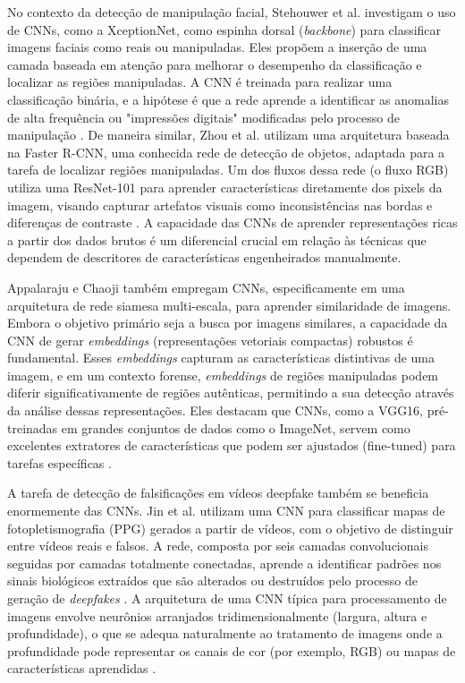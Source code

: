 No contexto da detecção de manipulação facial, Stehouwer et al. \cite{stehouwer2019detection} investigam o uso de CNNs, como a XceptionNet, como espinha dorsal (\textit{backbone}) para classificar imagens faciais como reais ou manipuladas. Eles propõem a inserção de uma camada baseada em atenção para melhorar o desempenho da classificação e localizar as regiões manipuladas. A CNN é treinada para realizar uma classificação binária, e a hipótese é que a rede aprende a identificar as anomalias de alta frequência ou "impressões digitais" modificadas pelo processo de manipulação \cite{stehouwer2019detection}. De maneira similar, Zhou et al. \cite{zhou2018manipulation} utilizam uma arquitetura baseada na Faster R-CNN, uma conhecida rede de detecção de objetos, adaptada para a tarefa de localizar regiões manipuladas. Um dos fluxos dessa rede (o fluxo RGB) utiliza uma ResNet-101 para aprender características diretamente dos pixels da imagem, visando capturar artefatos visuais como inconsistências nas bordas e diferenças de contraste \cite{zhou2018manipulation}. A capacidade das CNNs de aprender representações ricas a partir dos dados brutos é um diferencial crucial em relação às técnicas que dependem de descritores de características engenheirados manualmente.

Appalaraju e Chaoji \cite{appalaraju2017image} também empregam CNNs, especificamente em uma arquitetura de rede siamesa multi-escala, para aprender similaridade de imagens. Embora o objetivo primário seja a busca por imagens similares, a capacidade da CNN de gerar \textit{embeddings} (representações vetoriais compactas) robustos é fundamental. Esses \textit{embeddings} capturam as características distintivas de uma imagem, e em um contexto forense, \textit{embeddings} de regiões manipuladas podem diferir significativamente de regiões autênticas, permitindo a sua detecção através da análise dessas representações. Eles destacam que CNNs, como a VGG16, pré-treinadas em grandes conjuntos de dados como o ImageNet, servem como excelentes extratores de características que podem ser ajustados (fine-tuned) para tarefas específicas \cite{appalaraju2017image}.

A tarefa de detecção de falsificações em vídeos deepfake também se beneficia enormemente das CNNs. Jin et al. \cite{jin2021analise} utilizam uma CNN para classificar mapas de fotopletismografia (PPG) gerados a partir de vídeos, com o objetivo de distinguir entre vídeos reais e falsos. A rede, composta por seis camadas convolucionais seguidas por camadas totalmente conectadas, aprende a identificar padrões nos sinais biológicos extraídos que são alterados ou destruídos pelo processo de geração de \textit{deepfakes} \cite{jin2021analise}. A arquitetura de uma CNN típica para processamento de imagens envolve neurônios arranjados tridimensionalmente (largura, altura e profundidade), o que se adequa naturalmente ao tratamento de imagens onde a profundidade pode representar os canais de cor (por exemplo, RGB) ou mapas de características aprendidas \cite{salles2021estimacao}.

